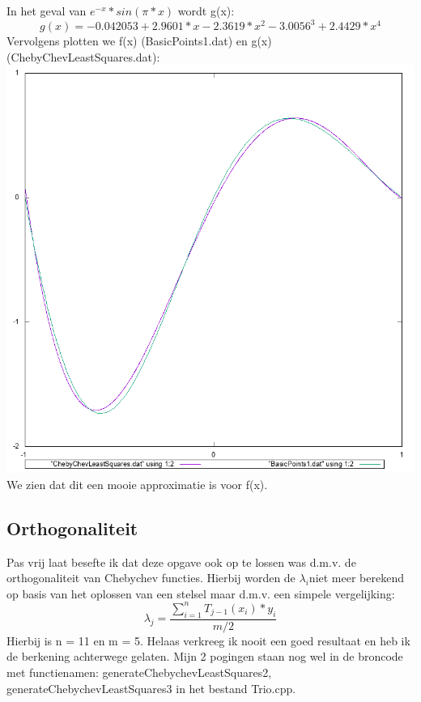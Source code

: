\documentclass[10pt,a4paper]{article}
\begin{document}
In het geval van $e^{-x}*sin(\pi *x)$ wordt g(x): 
$$g(x) = -0.042053 + 2.9601*x - 2.3619*x^{2} - 3.0056^{3} + 2.4429*x^{4}$$
Vervolgens plotten we f(x) (BasicPoints1.dat) en g(x) (ChebyChevLeastSquares.dat):
\newline
\includegraphics[scale=0.7]{ChebyChevLeastSquares.png}
\newline
We zien dat dit een mooie approximatie is voor f(x).

\subsection{Orthogonaliteit}
Pas vrij laat besefte ik dat deze opgave ook op te lossen was d.m.v. de orthogonaliteit van Chebychev functies. Hierbij worden de $\lambda_{i}$niet meer berekend op basis van het oplossen van een stelsel maar d.m.v. een simpele vergelijking: 
$$ \lambda_{j} = \frac{\sum^{n}_{i = 1}T_{j-1}(x_{i})*y_{i}}{m/2}$$
Hierbij is n = 11 en m = 5. Helaas verkreeg ik nooit een goed resultaat en heb ik de berkening achterwege gelaten. Mijn 2 pogingen staan nog wel in de broncode met functienamen: generateChebychevLeastSquares2, generateChebychevLeastSquares3 in het bestand Trio.cpp.
 
\end{document}
